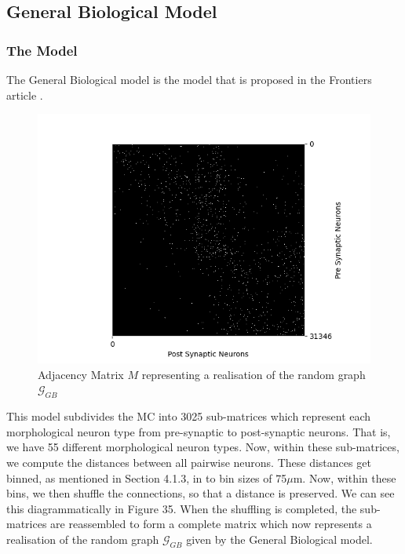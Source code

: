 \newpage
\subsection{General Biological Model}
\subsubsection{The Model}
The General Biological model is the model that is proposed in the Frontiers article \cite{Reimann_2017}.

\begin{figure}[H]
\begin{center}
\captionsetup{justification=centering}
\includegraphics[width=12cm]{GB/matrix_general_biol.png}
\caption{Adjacency Matrix $M$ representing a realisation of the random graph $\mathcal{G}_{GB}$}
\end{center}
\end{figure}

This model subdivides the MC into 3025 sub-matrices which represent each morphological neuron type from pre-synaptic to post-synaptic neurons. That is, we have 55 different morphological neuron types. Now, within these sub-matrices, we compute the distances between all pairwise neurons. These distances get binned, as mentioned in Section 4.1.3, in to bin sizes of 75$\mu$m. Now, within these bins, we then shuffle the connections, so that a distance is preserved. We can see this diagrammatically in Figure 35. When the shuffling is completed, the sub-matrices are reassembled to form a complete matrix which now represents a realisation of the random graph $\mathcal{G}_{GB}$ given by the General Biological model.

